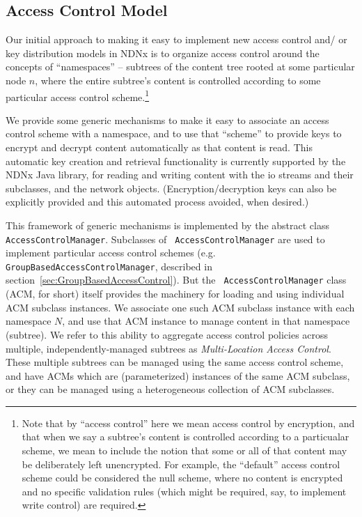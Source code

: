 \subsection{Access Control Model}
\label{sec:model}

Our initial approach to making it easy to implement new access control and/
or key distribution models in NDNx is to organize access control around
the concepts of ``namespaces'' -- subtrees of the content tree rooted
at some particular node $n$, where the entire subtree's content is
controlled according to some particular access control scheme.\footnote{
Note that by ``access control'' here we mean access control by encryption,
and that when we say a subtree's content is controlled according to a particualar
scheme, we mean to include the notion that some or all of that content may be
deliberately left unencrypted. For example, the ``default'' access control
scheme could be considered the null scheme, where no content is encrypted and
no specific validation rules (which might be required, say, to implement
write control) are required.}

We provide some generic mechanisms to make it easy to associate an
access control scheme with a namespace, and to use that ``scheme'' to
provide keys to encrypt and decrypt content automatically as that
content is read. This automatic key creation and retrieval
functionality is currently supported by the NDNx Java library, for
reading and writing content with the io streams and their subclasses,
and the network objects. (Encryption/decryption keys can also be explicitly
provided and this automated process avoided, when desired.)

This framework of generic mechanisms is implemented by the abstract
class {\tt AccessControlManager}.  Subclasses of {\tt
  AccessControlManager} are used to implement particular access
control schemes (e.g. {\tt GroupBasedAccessControlManager}, described
in section~\ref{sec:GroupBasedAccessControl}). But the {\tt
  AccessControlManager} class (ACM, for short) itself provides the
machinery for loading and using individual ACM subclass instances. We
associate one such ACM subclass instance with each namespace $N$, and
use that ACM instance to manage content in that namespace
(subtree). We refer to this ability to aggregate access control
policies across multiple, independently-managed subtrees as
\emph{Multi-Location Access Control}. These multiple subtrees can
be managed using the same access control scheme, and have ACMs which are
(parameterized) instances of the same ACM subclass, or they can be managed
using a heterogeneous collection of ACM subclasses.

